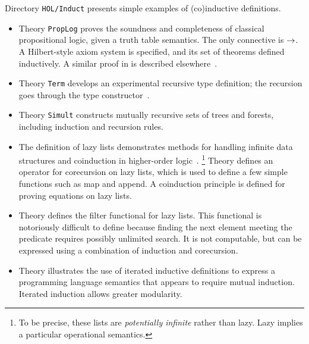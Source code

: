 Directory \texttt{HOL/Induct} presents simple examples of (co)inductive
definitions.  
\begin{itemize}
\item Theory \texttt{PropLog} proves the soundness and completeness of
  classical propositional logic, given a truth table semantics.  The only
  connective is $\rightarrow$.  A Hilbert-style axiom system is specified, and its
  set of theorems defined inductively.  A similar proof in \ZF{} is
  described elsewhere~\cite{paulson-set-II}.

\item Theory \texttt{Term} develops an experimental recursive type definition;
  the recursion goes through the type constructor~.

\item Theory \texttt{Simult} constructs mutually recursive sets of trees and
  forests, including induction and recursion rules.

\item The definition of lazy lists demonstrates methods for handling
  infinite data structures and coinduction in higher-order
  logic~\cite{paulson-coind}.%
\footnote{To be precise, these lists are \emph{potentially infinite} rather
  than lazy.  Lazy implies a particular operational semantics.}
  Theory  defines an operator for
  corecursion on lazy lists, which is used to define a few simple functions
  such as map and append.   A coinduction principle is defined
  for proving equations on lazy lists.
  
\item Theory  defines the filter functional for lazy lists.
  This functional is notoriously difficult to define because finding the next
  element meeting the predicate requires possibly unlimited search.  It is not
  computable, but can be expressed using a combination of induction and
  corecursion.  

\item Theory  illustrates the use of iterated inductive definitions
  to express a programming language semantics that appears to require mutual
  induction.  Iterated induction allows greater modularity.
\end{itemize}

